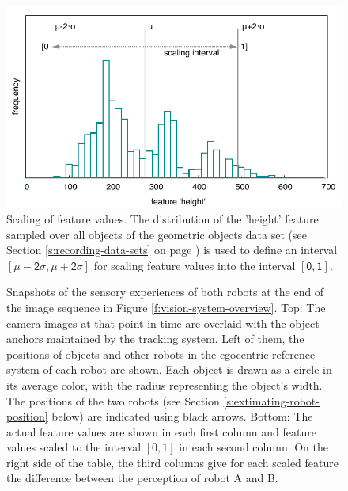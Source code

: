 \begin{figure}[t]
  \includegraphics[width=0.85\columnwidth]{figures/vision-system-scaling}
  \caption{Scaling of feature values. The distribution of the 'height'
    feature sampled over all objects of the geometric objects data set
    (see Section \ref{s:recording-data-sets} on page
    \pageref{s:recording-data-sets}) is used to define an interval
    $\mathsf{[\mu-2\sigma,\mu+2\sigma]}$ for scaling feature values
    into the interval $\mathsf{[0,1]}$.}
  \label{f:vision-system-scaling}
\end{figure}

\begin{figure}[t]
  
  \caption{Snapshots of the sensory experiences of both robots at the
    end of the image sequence in Figure
    \ref{f:vision-system-overview}. Top: The camera images at that
    point in time are overlaid with the object anchors maintained by
    the tracking system. Left of them, the positions of objects and
    other robots in the egocentric reference system of each robot are
    shown. Each object is drawn as a circle in its average color, with
    the radius representing the object's width. The positions of the
    two robots (see Section \ref{s:extimating-robot-position} below)
    are indicated using black arrows. Bottom: The actual feature
    values are shown in each first column and feature values scaled to
    the interval $[0,1]$ in each second column.  On the right side of
    the table, the third columns give for each scaled feature the
    difference between the perception of robot A and B.}
  \label{f:vision-system-example-scene}
\end{figure}

